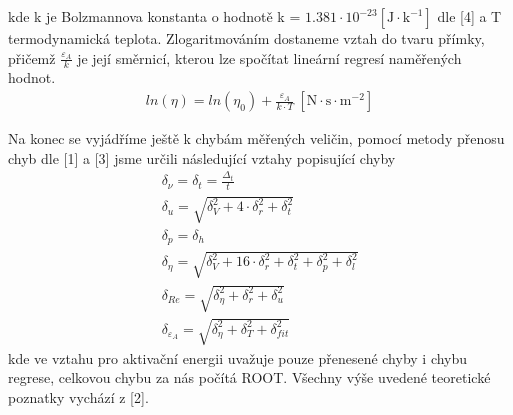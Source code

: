 \documentclass{article}
\begin{document}
kde k je Bolzmannova konstanta o hodnotě k = $1.381\cdot 10^{-23} \mathrm{[J \cdot k^{-1}]}$ dle [4] a T termodynamická teplota. Zlogaritmováním dostaneme vztah do tvaru přímky, přičemž $\frac{\varepsilon_{A}}{k}$ je její směrnicí, kterou lze spočítat lineární regresí naměřených hodnot.
\begin{align}
ln(\eta) = ln(\eta_{0}) + \frac{\varepsilon_{A}}{k \cdot T}\: \mathrm{[N \cdot s \cdot m^{-2}]}
\end{align}
\par Na konec se vyjádříme ještě k chybám měřených veličin, pomocí metody přenosu chyb dle [1] a [3] jsme určili následující vztahy popisující chyby
\begin{align}
\delta_{\nu} = \delta_{t} =\frac{\Delta_{t}}{t} \\
\delta_{u} = \sqrt{\delta_{V}^{2} + 4\cdot \delta_{r}^{2} + \delta_{t}^{2}} \\
\delta_{p} = \delta_{h} \\
\delta_{\eta} = \sqrt{\delta_{V}^{2} + 16\cdot \delta_{r}^{2} + \delta_{t}^{2} + \delta_{p}^{2} + \delta_{l}^{2}}\\
\delta_{Re} = \sqrt{\delta_{\eta}^{2} + \delta_{r}^{2} + \delta_{u}^{2}}\\
\delta_{\varepsilon_{A}} = \sqrt{\delta_{\eta}^{2} + \delta_{T}^{2} +\delta_{fit}^{2}}
\end{align}
kde ve vztahu pro aktivační energii uvažuje pouze přenesené chyby i chybu regrese, celkovou chybu za nás počítá ROOT. Všechny výše uvedené teoretické poznatky vychází z [2].
\end{document}
